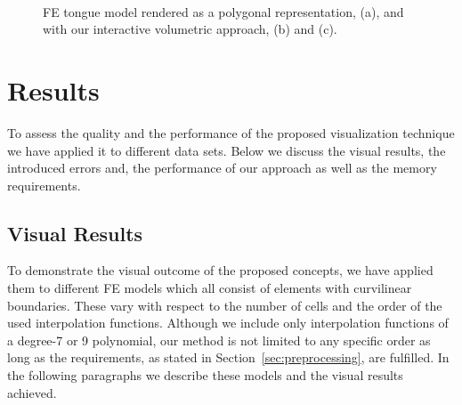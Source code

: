 \documentclass[journal]{vgtc}                %
\begin{document}
\begin{figure}
    \centering 
    \\
    \caption{FE tongue model rendered as a polygonal representation, (a), and with our interactive volumetric approach, (b) and (c).}
    \label{fig:tongue}
\end{figure}
%
%
%
\section{Results}\label{sec:results}
To assess the quality and the performance of the proposed visualization technique we have applied it to different data sets. Below we discuss the visual results, the introduced errors and, the performance of our approach as well as the memory requirements.
%
%
%
\subsection{Visual Results}
To demonstrate the visual outcome of the proposed concepts, we have applied them to different FE models which all consist of elements with curvilinear boundaries. These vary with respect to the number of cells and the order of the used interpolation functions. Although we include only interpolation functions of a degree-7 or 9 polynomial, our method is not limited to any specific order as long as the requirements, as stated in Section~\ref{sec:preprocessing}, are fulfilled. In the following paragraphs we describe these models and the visual results achieved.
\end{document}
